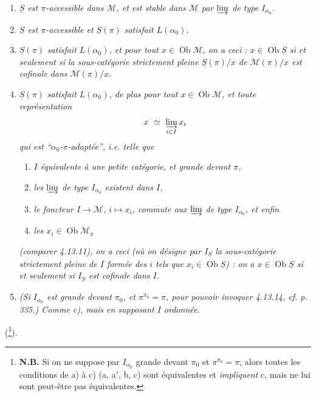 \documentclass[11pt]{article}
\newcommand{\msp}[1]{\marginpar{\footnotesize [#1]}}
\newcommand{\Ob}{\operatorname{Ob}}
\begin{document}
\begin{enumerate}[label={}]
\item[\textit{a)}] \textit{$\underline{S}$ est $\pi$-accessible dans $\mathcal{M}$, et est stable dans $\mathcal{M}$ par $\varinjlim$ de type $I_{\alpha_0}$.}
\item[\textit{a$'$)}] \textit{$\underline{S}$ est $\pi$-accessible et $\underline{S}(\pi)$ satisfait $L(\alpha_0)$.}
\item[\textit{b)}] \textit{$\underline{S}(\pi)$ satisfait $L(\alpha_0)$, et pour tout $x \in \Ob\mathcal{M}$, on a ceci : $x \in \Ob\underline{S}$ si et seulement si la sous-catégorie strictement pleine $\underline{S}(\pi)/x$ de $\mathcal{M}(\pi)/x$ est cofinale dans $\mathcal{M}(\pi)/x$}.
\item[\textit{c)}] \textit{$\underline{S}(\pi)$ satisfait $L(\alpha_0)$, de plus pour tout $x \in \Ob\mathcal{M}$, et toute représentation}
\[
x \ \simeq \ \varinjlim_{i\in I} x_i
\]
\msp{page 339}
\textit{qui est ``$\alpha_0$-$\pi$-adaptée'', i.e. telle que}
\begin{enumerate}[label={}]
\item[\textit{$1^\circ$)}] \textit{$I$ équivalente à une petite catégorie, et grande devant $\pi$,}
\item[\textit{$2^\circ$)}] \textit{les $\varinjlim$ de type $I_{\alpha_0}$ existent dans $I$,}
\item[\textit{$3^\circ$)}] \textit{le foncteur $I \longrightarrow \mathcal{M}$, $i \longmapsto x_i$, commute aux $\varinjlim$ de type $I_{\alpha_0}$, et enfin}
\item[\textit{$4^\circ$)}] \textit{les $x_i \in \Ob\mathcal{M}_\pi$}
\end{enumerate}
\textit{(comparer 4.13.11), on a ceci (où on désigne par $I_{\underline{S}}$ la sous-catégorie strictement pleine de $I$ formée des $i$ tels que $x_i \in \Ob\underline{S}$) : on a $x \in \Ob\underline{S}$ si et seulement si $I_{\underline{S}}$ est cofinale dans $I$.}
\item[\textit{c$'$)}] \textit{(\textup{Si} $I_{\alpha_0}$ est grande devant $\pi_0$, et $\pi^{\pi_0} = \pi$, pour pouvoir invoquer 4.13.14, cf. p. 335.) Comme c), mais en supposant $I$ ordonnée.}
\end{enumerate}
(\footnote[143]{\textbf{N.B.} Si on ne suppose par $I_{\alpha_0}$ grande devant $\pi_0$ et %
$\pi^{\pi_0} = \pi$, alors toutes les conditions de a) à c) (a, a$'$, b, c) sont équivalentes et \textit{impliquent} c, mais ne lui sont peut-être pas équivalentes.}).
\end{document}
